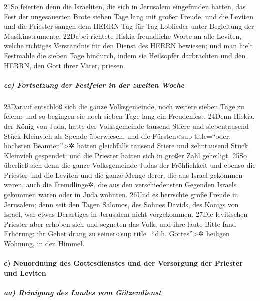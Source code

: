 21So feierten denn die Israeliten, die sich in Jerusalem eingefunden
hatten, das Fest der ungesäuerten Brote sieben Tage lang mit großer
Freude, und die Leviten und die Priester sangen dem HERRN Tag für Tag
Loblieder unter Begleitung der Musikinstrumente. 22Dabei richtete Hiskia
freundliche Worte an alle Leviten, welche richtiges Verständnis für den
Dienst des HERRN bewiesen; und man hielt Festmahle die sieben Tage
hindurch, indem sie Heilsopfer darbrachten und den HERRN, den Gott ihrer
Väter, priesen.

\hypertarget{cc-fortsetzung-der-festfeier-in-der-zweiten-woche}{%
\subparagraph{cc) Fortsetzung der Festfeier in der zweiten
Woche}\label{cc-fortsetzung-der-festfeier-in-der-zweiten-woche}}

23Darauf entschloß sich die ganze Volksgemeinde, noch weitere sieben
Tage zu feiern; und so begingen sie noch sieben Tage lang ein
Freudenfest. 24Denn Hiskia, der König von Juda, hatte der Volksgemeinde
tausend Stiere und siebentausend Stück Kleinvieh als Spende überwiesen,
und die Fürsten\textless sup title=``oder: höchsten
Beamten''\textgreater✲ hatten gleichfalls tausend Stiere und zehntausend
Stück Kleinvieh gespendet; und die Priester hatten sich in großer Zahl
geheiligt. 25So überließ sich denn die ganze Volksgemeinde Judas der
Fröhlichkeit und ebenso die Priester und die Leviten und die ganze Menge
derer, die aus Israel gekommen waren, auch die Fremdlinge✲, die aus den
verschiedensten Gegenden Israels gekommen waren oder in Juda wohnten.
26Und es herrschte große Freude in Jerusalem; denn seit den Tagen
Salomos, des Sohnes Davids, des Königs von Israel, war etwas Derartiges
in Jerusalem nicht vorgekommen. 27Die levitischen Priester aber erhoben
sich und segneten das Volk, und ihre laute Bitte fand Erhörung: ihr
Gebet drang zu seiner\textless sup title=``d.h. Gottes''\textgreater✲
heiligen Wohnung, in den Himmel.

\hypertarget{c-neuordnung-des-gottesdienstes-und-der-versorgung-der-priester-und-leviten}{%
\paragraph{c) Neuordnung des Gottesdienstes und der Versorgung der
Priester und
Leviten}\label{c-neuordnung-des-gottesdienstes-und-der-versorgung-der-priester-und-leviten}}

\hypertarget{aa-reinigung-des-landes-vom-guxf6tzendienst}{%
\subparagraph{aa) Reinigung des Landes vom
Götzendienst}\label{aa-reinigung-des-landes-vom-guxf6tzendienst}}

